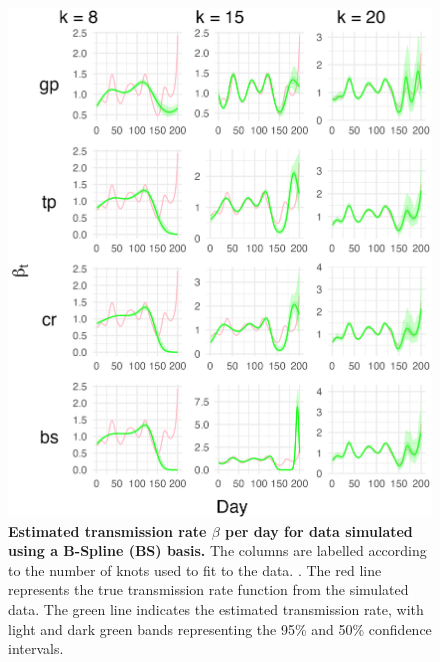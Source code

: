\documentclass[
11pt, %
oneside, %
english, %
singlespacing, %
]{macthesis} %
\begin{document}
\begin{figure}[H]
\centering
\includegraphics[width=\textwidth]{figure/Simulated/unaggregated/simulation_bs_20_k(5,10,20)_bsd1_beta1_plot_beta.png}
\caption[Estimated Simulated Data (BS) Transmission Rate]{\textbf{Estimated transmission rate \(\beta\) per day for data simulated using a B-Spline (BS) basis.} The columns are labelled according to the number of knots used to fit to the data. . The red line represents the true transmission rate function from the simulated data. The green line indicates the estimated transmission rate, with light and dark green bands representing the 95\% and 50\% confidence intervals.}
\label{fig:transmission20bs}
\end{figure}
\end{document}
